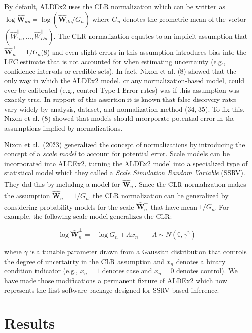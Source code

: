 \documentclass[
]{article}
\begin{document}
By default, ALDEx2 uses the CLR normalization which can be written as
\(\log \mathbf{\hat{W}}_{dn}=\log (\mathbf{\hat{W}}^{\parallel}_{dn}/G_{n})\)
where \(G_{n}\) denotes the geometric mean of the vector
\((\hat{W}^{\parallel}_{1n}, \dots, \hat{W}^{\parallel}_{Dn})\). The CLR
normalization equates to an implicit assumption that
\(\mathbf{\hat{W}}^{\perp}_{n}=1/G_{n}\)(8) and even slight errors in
this assumption introduces bias into the LFC estimate that is not
accounted for when estimating uncertainty (e.g., confidence intervals or
credible sets). In fact, Nixon et al. (8) showed that the only way in
which the ALDEx2 model, or any normalization-based model, could ever be
calibrated (e.g., control Type-I Error rates) was if this assumption was
exactly true. In support of this assertion it is known that false
discovery rates vary widely by analysis, dataset, and normalization
method (34, 35). To fix this, Nixon et al. (8) showed that models should
incorporate potential error in the assumptions implied by
normalizations.

Nixon et al.~(2023) generalized the concept of normalizations by
introducing the concept of a \textit{scale model} to account for
potential error. Scale models can be incorporated into ALDEx2, turning
the ALDEx2 model into a specialized type of statistical model which they
called a \textit{Scale Simulation Random   Variable} (SSRV). They did
this by including a model for \(\mathbf{\hat{W}}^{\perp}_{n}\). Since
the CLR normalization makes the assumption
\(\mathbf{\hat{W}}^{\perp}_{n}=1/G_{n}\), the CLR normalization can be
generalized by considering probability models for the scale
\(\mathbf{\hat{W}}^{\perp}_{n}\) that have mean \(1/G_{n}\). For
example, the following scale model generalizes the CLR:

\[\log \mathbf{\hat{W}}^{\perp}_{n} = -\log G_{n} + \Lambda x_{n} \qquad \Lambda \sim N(0, \gamma^{2})\]

where \(\gamma\) is a tunable parameter drawn from a Gaussian
distribution that controls the degree of uncertainty in the CLR
assumption and \(x_{n}\) denotes a binary condition indicator (e.g.,
\(x_{n}=1\) denotes case and \(x_{n}=0\) denotes control). We have made
those modifications a permanent fixture of ALDEx2 which now represents
the first software package designed for SSRV-based inference.

\section{Results}\label{results}
\end{document}
